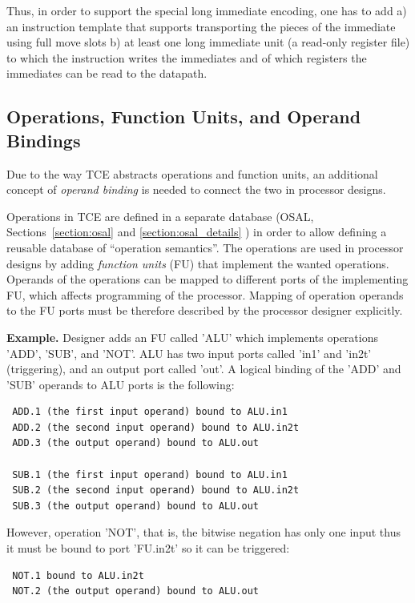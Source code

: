 \documentclass[twoside]{tceusermanual}
\begin{document}
Thus, in order to support the special long immediate encoding, one has
to add a) an instruction template that supports transporting the pieces
of the immediate using full move slots b) at least one long immediate
unit (a read-only register file) to which the instruction writes the
immediates and of which registers the immediates can be read to the
datapath.

\subsection{Operations, Function Units, and Operand Bindings}
Due to the way TCE abstracts operations and function units, an
additional concept of \textit{operand binding} is needed to 
connect the two in processor designs.

Operations in TCE are defined in a separate database (OSAL,
Sections~\ref{section:osal} and \ref{section:osal_details} ) in order
to allow defining a reusable database of ``operation semantics''. The
operations are used in processor designs by adding \textit{function
units} (FU) that implement the wanted operations. Operands of the
operations can be mapped to different ports of the implementing FU,
which affects programming of the processor. Mapping of operation
operands to the FU ports must be therefore described by the processor
designer explicitly.

\textbf{Example.} Designer adds an FU called 'ALU' which implements
operations 'ADD', 'SUB', and 'NOT'. ALU has two input ports called 'in1' and 
'in2t' (triggering), and an output port called 'out'. A logical binding of 
the 'ADD' and 'SUB' operands to ALU ports is the following:

\begin{verbatim}
 ADD.1 (the first input operand) bound to ALU.in1
 ADD.2 (the second input operand) bound to ALU.in2t
 ADD.3 (the output operand) bound to ALU.out

 SUB.1 (the first input operand) bound to ALU.in1
 SUB.2 (the second input operand) bound to ALU.in2t
 SUB.3 (the output operand) bound to ALU.out
\end{verbatim}

However, operation 'NOT', that is, the bitwise negation has only one input
thus it must be bound to port 'FU.in2t' so it can be triggered:

\begin{verbatim}
 NOT.1 bound to ALU.in2t
 NOT.2 (the output operand) bound to ALU.out
\end{verbatim}
\end{document}
